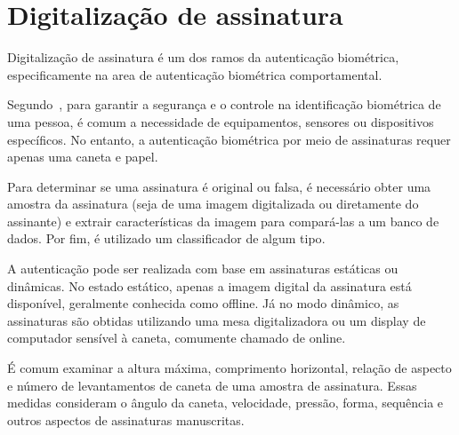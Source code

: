 \usepackage{wasysym}
\section{Digitalização de assinatura}

Digitalização de assinatura é um dos ramos da autenticação biométrica,
especificamente
na area de autenticação biométrica comportamental.

Segundo~\textcite{navaz2016}, para garantir a segurança e o controle na
identificação
biométrica de uma pessoa, é comum a necessidade de equipamentos, sensores ou
dispositivos específicos.
No entanto, a autenticação biométrica por meio de assinaturas requer apenas uma
caneta e papel.

Para determinar se uma assinatura é original ou falsa, é necessário obter uma
amostra da assinatura (seja de uma imagem digitalizada ou diretamente do
assinante)
e extrair características da imagem para compará-las a um banco de dados.
Por fim, é utilizado um classificador de algum tipo\cite{dewangan2015}.

A autenticação pode ser realizada com base em assinaturas estáticas ou dinâmicas.
No estado estático, apenas a imagem digital da assinatura está disponível,
geralmente conhecida como offline.
Já no modo dinâmico, as assinaturas são obtidas utilizando uma mesa
digitalizadora ou um display de computador sensível à caneta,
comumente chamado de online\cite{navaz2016}.

É comum examinar a altura máxima, comprimento horizontal, relação de aspecto e
número de levantamentos de caneta de uma amostra de assinatura.
Essas medidas consideram o ângulo da caneta, velocidade, pressão,
forma, sequência e outros aspectos de assinaturas manuscritas\cite{dewangan2015}.

